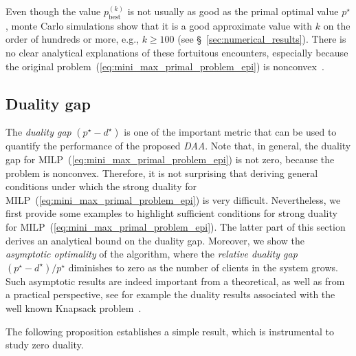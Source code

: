 \documentclass[journal, 10pt, twocolumn]{IEEEtran}
\begin{document}
Even though the value $p^{(k)}_{\mathrm{best}}$ is not usually as good as the primal optimal value $p^\star$, monte Carlo simulations show that it is a good approximate value with $k$ on the order of hundreds or more, e.g., $k\geq 100$ (see \S~\ref{sec:numerical_results}). There is no clear analytical explanations of these fortuitous encounters, especially because the original problem~(\ref{eq:mini_max_primal_problem_epi}) is nonconvex~\cite[\S~6.3]{Bertsekas-99}.

\vspace{-3mm}
\subsection{Duality gap}\label{subsec:duality_gap}
The \emph{duality gap} $(p^\star-d^\star)$ is one of the important metric that can be used to quantify the performance of the proposed \emph{DAA}. Note that, in general, the duality gap for MILP~(\ref{eq:mini_max_primal_problem_epi}) is not zero, because the problem is nonconvex. Therefore, it is not surprising that deriving general conditions under which the strong duality for MILP~(\ref{eq:mini_max_primal_problem_epi}) is very difficult. Nevertheless, we first provide some examples to highlight sufficient conditions for strong duality for MILP~(\ref{eq:mini_max_primal_problem_epi}). The latter part of this section derives an analytical bound on the duality gap. Moreover, we show the \emph{asymptotic optimality} of the algorithm, where the \emph{relative duality gap} $(p^\star-d^\star)/p^\star$ diminishes to zero as the number of clients in the system grows. Such asymptotic results are indeed important from a theoretical, as well as from a practical perspective, see for example the duality results associated with the well known Knapsack problem~\cite{Bertsekas-99}.

The following proposition establishes a simple result, which is instrumental to study zero duality.
\end{document}
